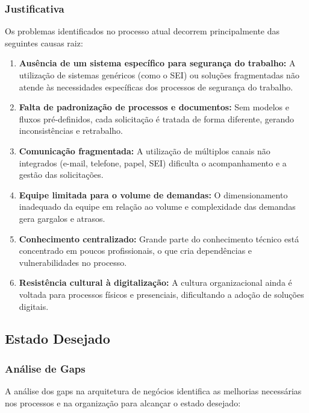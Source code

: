\documentclass[12pt,a4paper]{article}
\begin{document}
\subsubsection{Justificativa}
Os problemas identificados no processo atual decorrem principalmente das seguintes causas raiz:

\begin{enumerate}
    \item \textbf{Ausência de um sistema específico para segurança do trabalho:} A utilização de sistemas genéricos (como o SEI) ou soluções fragmentadas não atende às necessidades específicas dos processos de segurança do trabalho.
    
    \item \textbf{Falta de padronização de processos e documentos:} Sem modelos e fluxos pré-definidos, cada solicitação é tratada de forma diferente, gerando inconsistências e retrabalho.
    
    \item \textbf{Comunicação fragmentada:} A utilização de múltiplos canais não integrados (e-mail, telefone, papel, SEI) dificulta o acompanhamento e a gestão das solicitações.
    
    \item \textbf{Equipe limitada para o volume de demandas:} O dimensionamento inadequado da equipe em relação ao volume e complexidade das demandas gera gargalos e atrasos.
    
    \item \textbf{Conhecimento centralizado:} Grande parte do conhecimento técnico está concentrado em poucos profissionais, o que cria dependências e vulnerabilidades no processo.
    
    \item \textbf{Resistência cultural à digitalização:} A cultura organizacional ainda é voltada para processos físicos e presenciais, dificultando a adoção de soluções digitais.
\end{enumerate}

\clearpage
\subsection{Estado Desejado}

\subsubsection{Análise de Gaps}

A análise dos gaps na arquitetura de negócios identifica as melhorias necessárias nos processos e na organização para alcançar o estado desejado:
\end{document}

